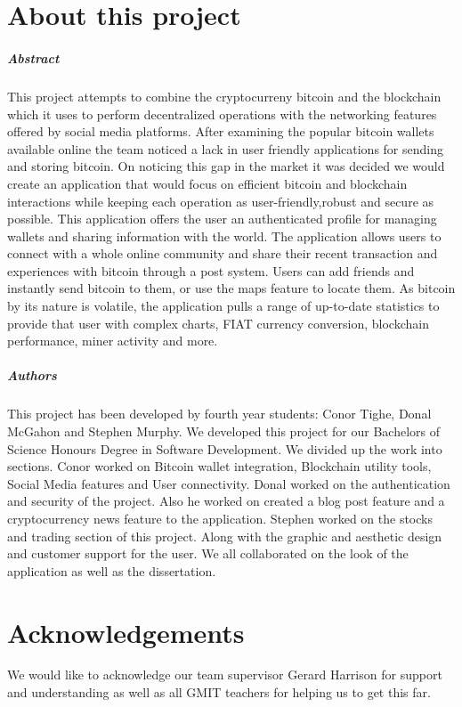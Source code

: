 
\chapter*{About this project}
\paragraph{Abstract}
This project attempts to combine the cryptocurreny bitcoin and the blockchain which it uses to perform decentralized operations with the networking features offered by social media platforms. After examining the popular bitcoin wallets available online the team noticed a lack in user friendly applications for sending and storing bitcoin. On noticing this gap in the market it was decided we would create an application that would focus on efficient bitcoin and blockchain interactions while keeping each operation as user-friendly,robust and secure as possible. This application offers the user an authenticated profile for managing wallets and sharing information with the world. The application allows users to connect with a whole online community and share their recent transaction and experiences with bitcoin through a post system. Users can add friends and instantly send bitcoin to them, or use the maps feature to locate them. As bitcoin by its nature is volatile, the application pulls a range of up-to-date statistics to provide that user with complex charts, FIAT currency conversion, blockchain performance, miner activity and more.

\paragraph{Authors}
This project has been developed by fourth year students: Conor Tighe, Donal McGahon and Stephen Murphy. We developed this project for our Bachelors of Science Honours Degree in Software Development. We divided up the work into sections. Conor worked on Bitcoin wallet integration, Blockchain utility tools, Social Media features and User connectivity. Donal worked on the authentication and security of the project. Also he worked on created a blog post feature and a cryptocurrency news feature to the application. Stephen worked on the stocks and trading section of this project. Along with the graphic and aesthetic design and customer support for the user. We all collaborated on the look of the application as well as the dissertation.

\chapter*{Acknowledgements}
We would like to acknowledge our team supervisor Gerard Harrison for support and understanding as well as all GMIT teachers for helping us to get this far.


